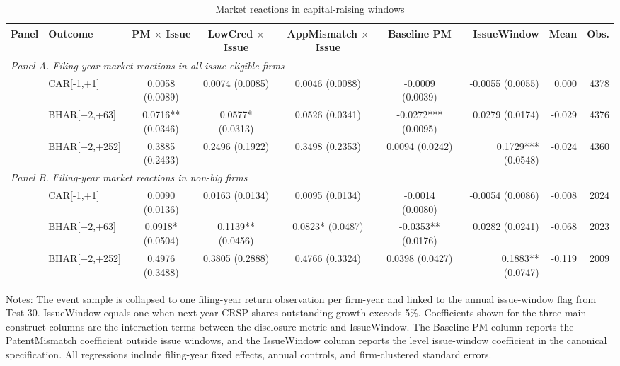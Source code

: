 \begin{table}[!htbp]
\centering
\caption{Market reactions in capital-raising windows}
\small
\begin{tabular}{llccccrrr}
\hline
Panel & Outcome & PM $\times$ Issue & LowCred $\times$ Issue & AppMismatch $\times$ Issue & Baseline PM & IssueWindow & Mean & Obs. \\
\hline
\multicolumn{9}{l}{\textit{Panel A. Filing-year market reactions in all issue-eligible firms}} \\
 & CAR[-1,+1] & 0.0058 (0.0089) & 0.0074 (0.0085) & 0.0046 (0.0088) & -0.0009 (0.0039) & -0.0055 (0.0055) & 0.000 & 4378 \\
 & BHAR[+2,+63] & 0.0716** (0.0346) & 0.0577* (0.0313) & 0.0526 (0.0341) & -0.0272*** (0.0095) & 0.0279 (0.0174) & -0.029 & 4376 \\
 & BHAR[+2,+252] & 0.3885 (0.2433) & 0.2496 (0.1922) & 0.3498 (0.2353) & 0.0094 (0.0242) & 0.1729*** (0.0548) & -0.024 & 4360 \\
\multicolumn{9}{l}{\textit{Panel B. Filing-year market reactions in non-big firms}} \\
 & CAR[-1,+1] & 0.0090 (0.0136) & 0.0163 (0.0134) & 0.0095 (0.0134) & -0.0014 (0.0080) & -0.0054 (0.0086) & -0.008 & 2024 \\
 & BHAR[+2,+63] & 0.0918* (0.0504) & 0.1139** (0.0456) & 0.0823* (0.0487) & -0.0353** (0.0176) & 0.0282 (0.0241) & -0.068 & 2023 \\
 & BHAR[+2,+252] & 0.4976 (0.3488) & 0.3805 (0.2888) & 0.4766 (0.3324) & 0.0398 (0.0427) & 0.1883** (0.0747) & -0.119 & 2009 \\
\hline
\end{tabular}
\begin{flushleft}
\footnotesize Notes: The event sample is collapsed to one filing-year return observation per firm-year and linked to the annual issue-window flag from Test 30. IssueWindow equals one when next-year CRSP shares-outstanding growth exceeds 5\%. Coefficients shown for the three main construct columns are the interaction terms between the disclosure metric and IssueWindow. The Baseline PM column reports the PatentMismatch coefficient outside issue windows, and the IssueWindow column reports the level issue-window coefficient in the canonical specification. All regressions include filing-year fixed effects, annual controls, and firm-clustered standard errors.
\end{flushleft}
\end{table}

